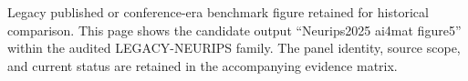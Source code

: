 Legacy published or conference-era benchmark figure retained for historical comparison. This page shows the candidate output ``Neurips2025 ai4mat figure5'' within the audited LEGACY-NEURIPS family. The panel identity, source scope, and current status are retained in the accompanying evidence matrix.

